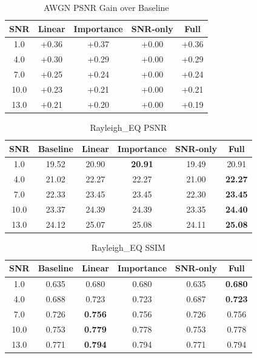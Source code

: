 \begin{table}[h]
\centering
\caption{AWGN PSNR Gain over Baseline}
\begin{tabular}{c|cccc}
\hline
SNR & Linear & Importance & SNR-only & Full \\ \hline
1.0 & +0.36 & +0.37 & +0.00 & +0.36 \\
4.0 & +0.30 & +0.29 & +0.00 & +0.29 \\
7.0 & +0.25 & +0.24 & +0.00 & +0.24 \\
10.0 & +0.23 & +0.21 & +0.00 & +0.21 \\
13.0 & +0.21 & +0.20 & +0.00 & +0.19 \\
\hline
\end{tabular}
\end{table}
\begin{table}[h]
\centering
\caption{Rayleigh_EQ PSNR}
\begin{tabular}{c|ccccc}
\hline
SNR & Baseline & Linear & Importance & SNR-only & Full \\ \hline
1.0 & 19.52 & 20.90 & \textbf{20.91} & 19.49 & 20.91 \\
4.0 & 21.02 & 22.27 & 22.27 & 21.00 & \textbf{22.27} \\
7.0 & 22.33 & 23.45 & 23.45 & 22.30 & \textbf{23.45} \\
10.0 & 23.37 & 24.39 & 24.39 & 23.35 & \textbf{24.40} \\
13.0 & 24.12 & 25.07 & 25.08 & 24.11 & \textbf{25.08} \\
\hline
\end{tabular}
\end{table}

\begin{table}[h]
\centering
\caption{Rayleigh_EQ SSIM}
\begin{tabular}{c|ccccc}
\hline
SNR & Baseline & Linear & Importance & SNR-only & Full \\ \hline
1.0 & 0.635 & 0.680 & 0.680 & 0.635 & \textbf{0.680} \\
4.0 & 0.688 & 0.723 & 0.723 & 0.687 & \textbf{0.723} \\
7.0 & 0.726 & \textbf{0.756} & 0.756 & 0.726 & 0.756 \\
10.0 & 0.753 & \textbf{0.779} & 0.778 & 0.753 & 0.778 \\
13.0 & 0.771 & \textbf{0.794} & 0.794 & 0.771 & 0.794 \\
\hline
\end{tabular}
\end{table}

